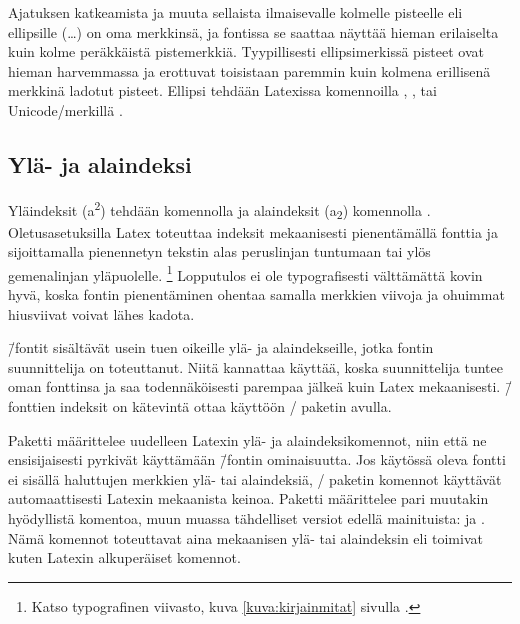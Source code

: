 Ajatuksen katkeamista ja muuta sellaista ilmaisevalle kolmelle pisteelle
eli ellipsille (\ldots) on oma merkkinsä, ja fontissa se saattaa näyttää
hieman erilaiselta kuin kolme peräkkäistä pistemerkkiä. Tyypillisesti
ellipsimerkissä pisteet ovat hieman harvemmassa ja erottuvat toisistaan
paremmin kuin kolmena erillisenä merkkinä ladotut pisteet. Ellipsi
tehdään Latexissa komennoilla , ,
 tai Unicode\-/merkillä .

\subsection{Ylä- ja alaindeksi}

Yläindeksit (a\textsuperscript{2}) tehdään komennolla
 ja alaindeksit (a\textsubscript{2})
komennolla . Oletusasetuksilla Latex toteuttaa
indeksit mekaanisesti pienentämällä fonttia ja sijoittamalla pienennetyn
tekstin alas peruslinjan tuntumaan tai ylös gemenalinjan yläpuolelle.%
\footnote{Katso typografinen viivasto, kuva \ref{kuva:kirjainmitat}
  sivulla \pageref{kuva:kirjainmitat}.} Lopputulos ei ole typografisesti
välttämättä kovin hyvä, koska fontin pienentäminen ohentaa samalla
merkkien viivoja ja ohuimmat hiusviivat voivat lähes kadota.

 \=/fontit sisältävät usein tuen oikeille ylä- ja
alaindekseille, jotka fontin suunnittelija on toteuttanut. Niitä
kannattaa käyttää, koska suunnittelija tuntee oman fonttinsa ja saa
todennäköisesti parempaa jälkeä kuin Latex mekaanisesti.  \=/fonttien indeksit on kätevintä ottaa käyttöön
\-/ paketin avulla.

Paketti  määrittelee uudelleen Latexin ylä- ja
alaindeksikomennot, niin että ne ensisijaisesti pyrkivät käyttämään
 \=/fontin ominaisuutta. Jos käytössä oleva fontti
ei sisällä haluttujen merkkien ylä- tai alaindeksiä,
\-/ paketin komennot käyttävät automaattisesti
Latexin mekaanista keinoa. Paketti määrittelee pari muutakin hyödyllistä
komentoa, muun muassa tähdelliset versiot edellä mainituista:
 ja . Nämä komennot
toteuttavat aina mekaanisen ylä- tai alaindeksin eli toimivat kuten
Latexin alkuperäiset komennot.


